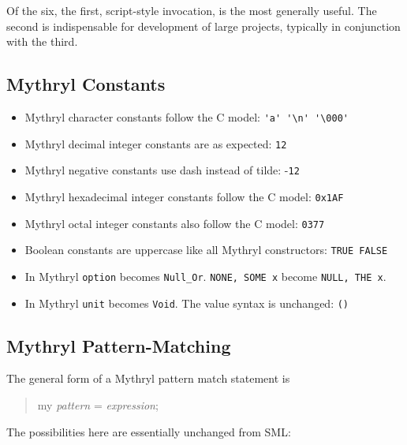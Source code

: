 Of the six, the first, script-style invocation, is the most generally useful.  The 
second is indispensable for development of large projects, typically in conjunction 
with the third.

\cutend*

\subsection{Mythryl Constants}

\begin{itemize}
\item Mythryl character constants follow the C model: {\tt \verb|'a' '\n' '\000'|}
\item Mythryl decimal integer constants are as expected: {\tt 12}
\item Mythryl negative constants use dash instead of tilde: -{\tt 12}
\item Mythryl hexadecimal integer constants follow the C model: {\tt 0x1AF}
\item Mythryl octal integer constants also follow the C model: {\tt 0377}
\item Boolean constants are uppercase like all Mythryl constructors: {\tt TRUE FALSE}
\item In Mythryl {\tt option} becomes {\tt Null\_Or}. {\tt NONE, SOME x} become {\tt NULL, THE x}.
\item In Mythryl {\tt unit} becomes {\tt Void}. The value syntax is unchanged:  {\tt ()}
\end{itemize}


\cutend*

\subsection{Mythryl Pattern-Matching}

The general form of a Mythryl pattern match statement is

\begin{quote}
    my {\it pattern} = {\it expression};
\end{quote}

The possibilities here are essentially unchanged from SML:


